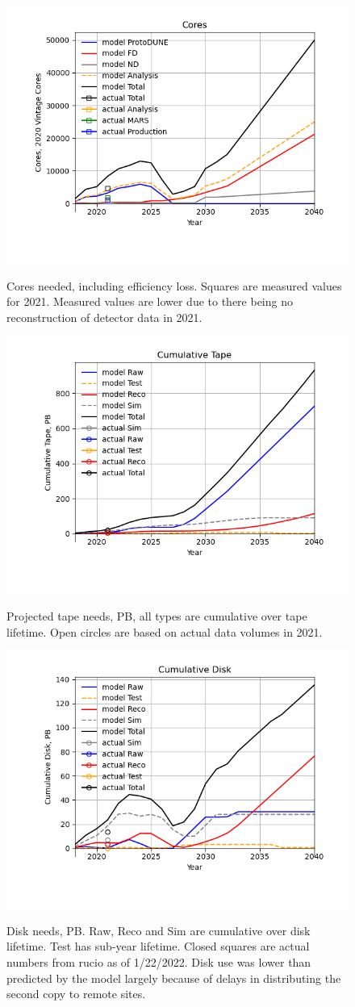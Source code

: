 \documentclass[12pt]{article}
\begin{document}
\begin{figure}[h]
\centering\includegraphics[height=0.4\textwidth]{Parameters_2022-03-04-2040-Cores.png}\label{Cores}
\caption{Cores needed, including efficiency loss. Squares are measured values for 2021.  Measured values are lower due to there being no reconstruction of detector data in 2021.}
\end{figure}
\begin{figure}[h]
\centering\includegraphics[height=0.4\textwidth]{Parameters_2022-03-04-2040-Cumulative-Tape.png}\label{CumulativeTape}
\caption{Projected  tape needs, PB, all types are cumulative over tape lifetime. Open circles are based on actual data volumes in 2021.}
\end{figure}
\begin{figure}[h]
\centering\includegraphics[height=0.4\textwidth]{Parameters_2022-03-04-2040-Cumulative-Disk}\label{CumulativeDisk}
\caption{Disk needs, PB.  Raw, Reco and Sim are cumulative over disk lifetime.  Test has sub-year lifetime. Closed squares are actual numbers from rucio as of 1/22/2022.  Disk use was lower than predicted by the model largely because of delays in distributing the second copy to remote sites.}
\end{figure}
\end{document}
